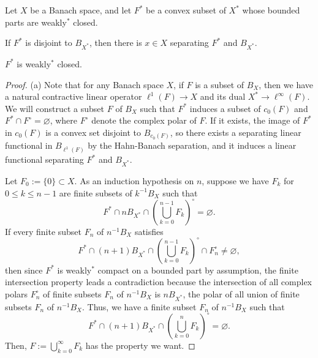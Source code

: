 \documentclass{../../large}
\begin{document}
\begin{prb}
\end{prb}
\begin{prb}
\end{prb}



\begin{prb}
Let $X$ be a Banach space, and let $F^*$ be a convex subset of $X^*$ whose bounded parts are weakly$^*$ closed.
\begin{parts}
\item If $F^*$ is disjoint to $B_{X^*}$, then there is $x\in X$ separating $F^*$ and $B_{X^*}$.
\item $F^*$ is weakly$^*$ closed.
\end{parts}
\end{prb}
\begin{proof}
(a)
Note that for any Banach space $X$, if $F$ is a subset of $B_X$, then we have a natural contractive linear operator $\ell^1(F)\to X$ and its dual $X^*\to\ell^\infty(F)$.
We will construct a subset $F$ of $B_X$ such that $F^*$ induces a subset of $c_0(F)$ and $F^*\cap F^\circ=\varnothing$, where $F^\circ$ denote the complex polar of $F$.
If it exists, the image of $F^*$ in $c_0(F)$ is a convex set disjoint to $B_{c_0(F)}$, so there exists a separating linear functional in $B_{\ell^1(F)}$ by the Hahn-Banach separation, and it induces a linear functional separating $F^*$ and $B_{X^*}$.

Let $F_0:=\{0\}\subset X$.
As an induction hypothesis on $n$, suppose we have $F_k$ for $0\le k\le n-1$ are finite subsets of $k^{-1}B_X$ such that
\[F^*\cap nB_{X^*}\cap\left(\bigcup_{k=0}^{n-1}F_k\right)^\circ=\varnothing.\]
If every finite subset $F_n$ of $n^{-1}B_X$ satisfies
\[F^*\cap(n+1)B_{X^*}\cap\left(\bigcup_{k=0}^{n-1}F_k\right)^\circ\cap F_n^\circ\ne\varnothing,\]
then since $F^*$ is weakly$^*$ compact on a bounded part by assumption, the finite intersection property leads a contradiction because the intersection of all complex polars $F_n^\circ$ of finite subsets $F_n$ of $n^{-1}B_X$ is $nB_{X^*}$, the polar of all union of finite subsets $F_n$ of $n^{-1}B_X$.
Thus, we have a finite subset $F_n$ of $n^{-1}B_X$ such that
\[F^*\cap(n+1)B_{X^*}\cap\left(\bigcup_{k=0}^nF_k\right)^\circ=\varnothing.\]
Then, $F:=\bigcup_{k=0}^\infty F_k$ has the property we want.

\end{proof}
\end{document}
